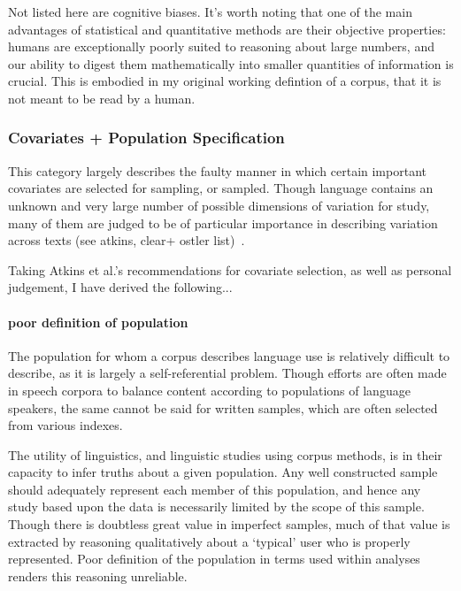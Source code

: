 

Not listed here are cognitive biases. It's worth noting that one of the main advantages of statistical and quantitative methods are their objective properties: humans are exceptionally poorly suited to reasoning about large numbers, and our ability to digest them mathematically into smaller quantities of information is crucial. This is embodied in my original working defintion of a corpus, that it is not meant to be read by a human.  


\subsubsection{Covariates + Population Specification}
This category largely describes the faulty manner in which certain important covariates are selected for sampling, or sampled. Though language contains an unknown and very large number of possible dimensions of variation for study, many of them are judged to be of particular importance in describing variation across texts (see atkins, clear+ ostler list)~\cite{atkins1992corpus}.

Taking Atkins et al.'s recommendations for covariate selection, as well as personal judgement, I have derived the following...



\paragraph{ poor definition of population}
The population for whom a corpus describes language use is relatively difficult to describe, as it is largely a self-referential problem. Though efforts are often made in speech corpora to balance content according to populations of language speakers, the same cannot be said for written samples, which are often selected from various indexes.

The utility of linguistics, and linguistic studies using corpus methods, is in their capacity to infer truths about a given population. Any well constructed sample should adequately represent each member of this population, and hence any study based upon the data is necessarily limited by the scope of this sample. Though there is doubtless great value in imperfect samples, much of that value is extracted by reasoning qualitatively about a `typical' user who is properly represented. Poor definition of the population in terms used within analyses renders this reasoning unreliable.

